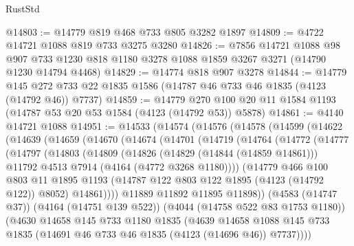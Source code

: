 \begin{lexlean}{RustStd}
\begin{coremodule}
@14803 := @14779 @819 @468 @733 @805 @3282 @1897
@14809 := @4722 @14721 @1088 @819 @733 @3275 @3280
@14826 := @7856
    @14721
    @1088
    @98
    @907
    @733
    @1230
    @818
    @1180
    @3278
    @1088
    @1859
    @3267
    @3271
    (@14790 @1230 @14794 @4468)
@14829 := @14774 @818 @907 @3278
@14844 := @14779
    @145
    @272
    @733
    @22
    @1835
    @1586
    (@14787 @46 @733 @46 @1835 (@4123 (@14792 @46)) @7737)
@14859 := @14779 @270 @100 @20 @11 @1584 @1193 (@14787 @53 @20 @53 @1584 (@4123 (@14792 @53)) @5878)
@14861 := @4140 @14721 @1088
@14951 := @14533
    (@14574
      (@14576
        (@14578
          (@14599
            (@14622
              (@14639
                (@14659
                  (@14670
                    (@14674
                      (@14701
                        (@14719
                          (@14764
                            (@14772
                              (@14777
                                (@14797
                                  (@14803
                                    (@14809
                                      (@14826
                                        (@14829 (@14844 (@14859 @14861)))
                                        @11792
                                        @4513
                                        @7914
                                        (@4164 (@4772 @3268 @1180))))
                                    (@14779
                                      @466
                                      @100
                                      @803
                                      @11
                                      @1895
                                      @1193
                                      (@14787 @122 @803 @122 @1895 (@4123 (@14792 @122)) @8052)
                                      @14861))))
                              @11889
                              @11892
                              @11895
                              @11898))
                          (@4583 (@14747 @37))
                          (@4164 (@14751 @139 @522))
                          (@4044 (@14758 @522 @83 @1753 @1180))
                          (@4630
                            @14658
                            @145
                            @733
                            @1180
                            @1835
                            (@4639
                              @14658
                              @1088
                              @145
                              @733
                              @1835
                              (@14691 @46 @733 @46 @1835 (@4123 (@14696 @46)) @7737))))

\end{coremodule}
\end{lexlean}
